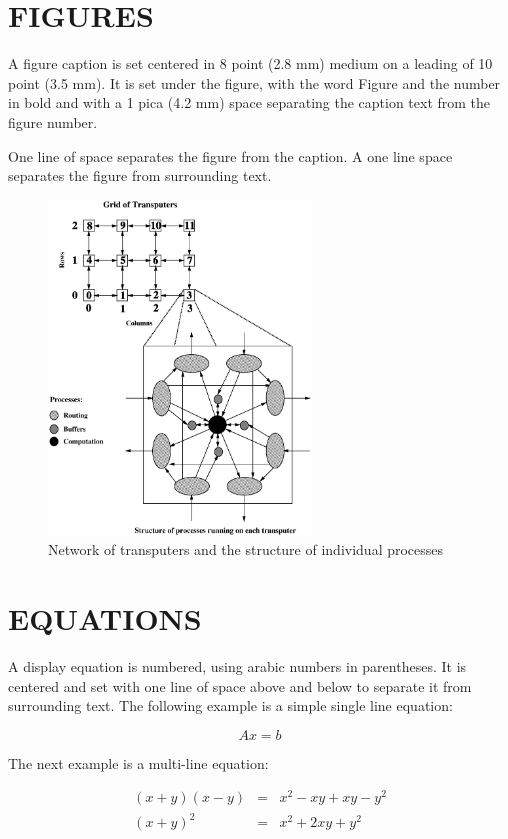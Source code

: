 \documentclass{ecai2012}
\begin{document}
\section{FIGURES}
A figure caption is set centered in 8 point (2.8 mm) medium on a
leading of 10 point (3.5 mm).  It is set under the figure, with the
word Figure and the number in bold and with a 1 pica (4.2 mm) space
separating the caption text from the figure number.

One line of space separates the figure from the caption. A one line
space separates the figure from surrounding text.

\begin{figure}
\centerline{\includegraphics[height=3.5in]{ecaif01.ps}}
\caption{Network of transputers and the structure of individual
processes } \label{procstructfig}
\end{figure}

\section{EQUATIONS}
A display equation is numbered, using arabic numbers in parentheses.
It is centered and set with one line of space above and below to
separate it from surrounding text. The following example is a simple
single line equation:

\begin{equation}
Ax=b
\label{thesystem}
\end{equation}

The next example is a multi-line equation:

\begin{eqnarray}
(x+y)(x-y) & = & x^2-xy+xy-y^2\\
(x+y)^2    & = & x^2+2xy+y^2
\end{eqnarray}
\end{document}
